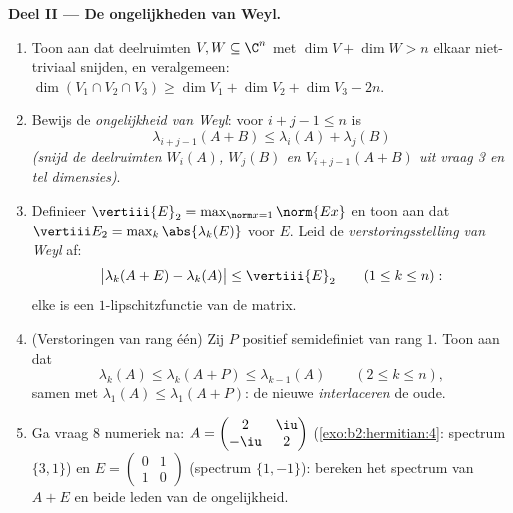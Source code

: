 \begin{problem}
\medskip
\noindent\textbf{Deel II --- De ongelijkheden van Weyl.}
\begin{enumerate}[resume]
  \item Toon aan dat deelruimten $V, W \subseteq \C^n$ met $\dim V
        + \dim W > n$ elkaar niet-triviaal snijden, en
        veralgemeen: $\dim(V_1 \cap V_2 \cap V_3) \geq \dim V_1 +
        \dim V_2 + \dim V_3 - 2n$.
  \item Bewijs de \emph{ongelijkheid van Weyl}: voor $i + j - 1
        \leq n$ is
        \[
        \lambda_{i+j-1}(A + B) \leq \lambda_i(A) +
        \lambda_j(B)
        \]
        \emph{(snijd de deelruimten $W_i(A)$, $W_j(B)$ en
        $V_{i+j-1}(A+B)$ uit vraag 3 en tel dimensies)}.
  \item Definieer $\vertiii{E}_2 = \max_{\norm x = 1}\norm{Ex}$ en
        toon aan dat $\vertiii E_2 = \max_k\abs{\lambda_k(E)}$
        voor  $E$. Leid de
        \emph{verstoringsstelling van Weyl} af:
        \[
        \bigl|\lambda_k(A + E) - \lambda_k(A)\bigr| \leq
        \vertiii{E}_2
        \qquad (1 \leq k \leq n) :
        \]
        elke  is een $1$-lipschitzfunctie van de
        matrix.
  \item (Verstoringen van rang één) Zij $P$  positief
        semidefiniet van rang $1$. Toon aan dat
        \[
        \lambda_k(A) \leq \lambda_k(A + P) \leq
        \lambda_{k-1}(A) \qquad (2 \leq k \leq n),
        \]
        samen met $\lambda_1(A) \leq \lambda_1(A+P)$: de nieuwe
         \emph{interlaceren} de oude.
  \item Ga vraag 8 numeriek na: $A = \begin{pmatrix} 2 &
        \iu\\ -\iu & 2\end{pmatrix}$ (\cref{exo:b2:hermitian:4}:
        spectrum $\{3, 1\}$) en $E = \begin{pmatrix} 0 & 1\\ 1 &
        0\end{pmatrix}$ (spectrum $\{1, -1\}$): bereken het
        spectrum van $A + E$ en beide leden van de ongelijkheid.
\end{enumerate}


\end{problem}
